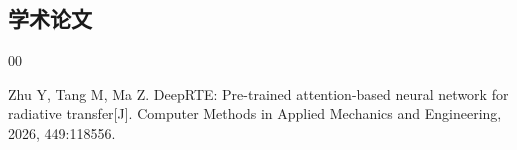 
\begin{achievements}

    \subsection*{学术论文}

    \begin{bibliolist}{00}
        \item Zhu Y, Tang M, Ma Z. DeepRTE: Pre-trained attention-based neural network for radiative transfer[J]. Computer Methods in Applied Mechanics and Engineering, 2026, 449:118556.
    \end{bibliolist}

\end{achievements}